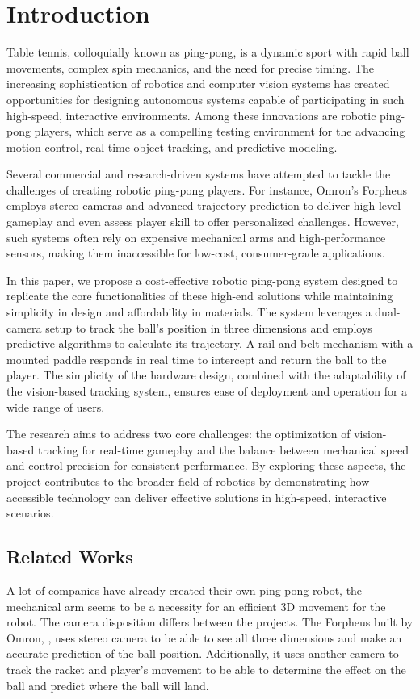 \chapter{Introduction}

Table tennis, colloquially known as ping-pong, is a dynamic sport with rapid ball movements, complex spin mechanics, and the need for precise timing. The increasing sophistication of robotics and computer vision systems has created opportunities for designing autonomous systems capable of participating in such high-speed, interactive environments. Among these innovations are robotic ping-pong players, which serve as a compelling testing environment for the advancing motion control, real-time object tracking, and predictive modeling.

Several commercial and research-driven systems have attempted to tackle the challenges of creating robotic ping-pong players. For instance, Omron's Forpheus employs stereo cameras and advanced trajectory prediction to deliver high-level gameplay and even assess player skill to offer personalized challenges. However, such systems often rely on expensive mechanical arms and high-performance sensors, making them inaccessible for low-cost, consumer-grade applications.

In this paper, we propose a cost-effective robotic ping-pong system designed to replicate the core functionalities of these high-end solutions while maintaining simplicity in design and affordability in materials. The system leverages a dual-camera setup to track the ball's position in three dimensions and employs predictive algorithms to calculate its trajectory. A rail-and-belt mechanism with a mounted paddle responds in real time to intercept and return the ball to the player. The simplicity of the hardware design, combined with the adaptability of the vision-based tracking system, ensures ease of deployment and operation for a wide range of users.

The research aims to address two core challenges: the optimization of vision-based tracking for real-time gameplay and the balance between mechanical speed and control precision for consistent performance. By exploring these aspects, the project contributes to the broader field of robotics by demonstrating how accessible technology can deliver effective solutions in high-speed, interactive scenarios.

\section{Related Works}
A lot of companies have already created their own ping pong robot, the mechanical arm seems to be a necessity for an efficient 3D movement for the robot. The camera disposition differs between the projects. The Forpheus built by Omron, \cite{Kyohei2019}, uses stereo camera to be able to see all three dimensions and make an accurate prediction of the ball position. Additionally, it uses another camera to track the racket and player's movement to be able to determine the effect on the ball and predict where the ball will land.

